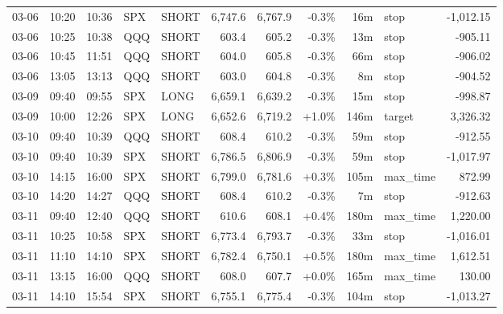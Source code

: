 \documentclass[11pt,a4paper,twoside]{article}
\begin{document}
\begin{center}
\begin{longtable}{>{\color{txtmain}}l l l l l r r r r >{\color{txtmain}}l r}
03-06 & 10:20 & 10:36 & SPX & SHORT & 6,747.6 & 6,767.9 & \textcolor{lossred}{-0.3\%} & 16m & stop & \textcolor{lossred}{-1,012.15} \\
03-06 & 10:25 & 10:38 & QQQ & SHORT & 603.4 & 605.2 & \textcolor{lossred}{-0.3\%} & 13m & stop & \textcolor{lossred}{-905.11} \\
03-06 & 10:45 & 11:51 & QQQ & SHORT & 604.0 & 605.8 & \textcolor{lossred}{-0.3\%} & 66m & stop & \textcolor{lossred}{-906.02} \\
03-06 & 13:05 & 13:13 & QQQ & SHORT & 603.0 & 604.8 & \textcolor{lossred}{-0.3\%} & 8m & stop & \textcolor{lossred}{-904.52} \\
03-09 & 09:40 & 09:55 & SPX & LONG & 6,659.1 & 6,639.2 & \textcolor{lossred}{-0.3\%} & 15m & stop & \textcolor{lossred}{-998.87} \\
03-09 & 10:00 & 12:26 & SPX & LONG & 6,652.6 & 6,719.2 & \textcolor{wingreen}{+1.0\%} & 146m & target & \textcolor{wingreen}{3,326.32} \\
03-10 & 09:40 & 10:39 & QQQ & SHORT & 608.4 & 610.2 & \textcolor{lossred}{-0.3\%} & 59m & stop & \textcolor{lossred}{-912.55} \\
03-10 & 09:40 & 10:39 & SPX & SHORT & 6,786.5 & 6,806.9 & \textcolor{lossred}{-0.3\%} & 59m & stop & \textcolor{lossred}{-1,017.97} \\
03-10 & 14:15 & 16:00 & SPX & SHORT & 6,799.0 & 6,781.6 & \textcolor{wingreen}{+0.3\%} & 105m & max\_time & \textcolor{wingreen}{872.99} \\
03-10 & 14:20 & 14:27 & QQQ & SHORT & 608.4 & 610.2 & \textcolor{lossred}{-0.3\%} & 7m & stop & \textcolor{lossred}{-912.63} \\
03-11 & 09:40 & 12:40 & QQQ & SHORT & 610.6 & 608.1 & \textcolor{wingreen}{+0.4\%} & 180m & max\_time & \textcolor{wingreen}{1,220.00} \\
03-11 & 10:25 & 10:58 & SPX & SHORT & 6,773.4 & 6,793.7 & \textcolor{lossred}{-0.3\%} & 33m & stop & \textcolor{lossred}{-1,016.01} \\
03-11 & 11:10 & 14:10 & SPX & SHORT & 6,782.4 & 6,750.1 & \textcolor{wingreen}{+0.5\%} & 180m & max\_time & \textcolor{wingreen}{1,612.51} \\
03-11 & 13:15 & 16:00 & QQQ & SHORT & 608.0 & 607.7 & \textcolor{wingreen}{+0.0\%} & 165m & max\_time & \textcolor{wingreen}{130.00} \\
03-11 & 14:10 & 15:54 & SPX & SHORT & 6,755.1 & 6,775.4 & \textcolor{lossred}{-0.3\%} & 104m & stop & \textcolor{lossred}{-1,013.27} \\

\end{longtable}
\end{center}
\end{document}
